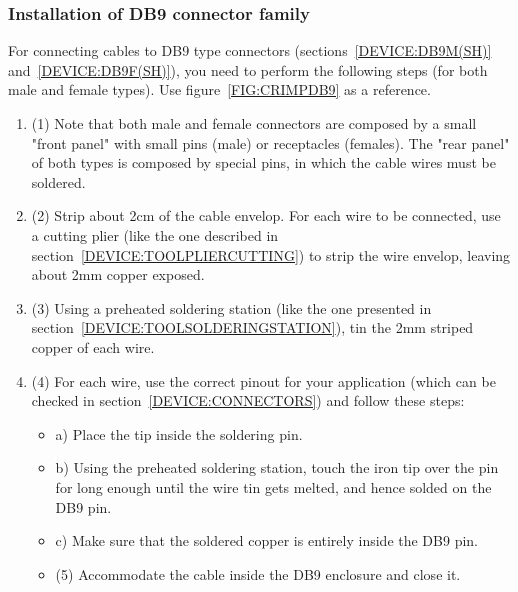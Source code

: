 \subsubsection{Installation of DB9 connector family} \label{CRIMPINGDB9}
For connecting cables to DB9 type connectors (sections~\ref{DEVICE:DB9M(SH)} and~\ref{DEVICE:DB9F(SH)}), you need to perform the following steps (for both male and female types). Use figure~\ref{FIG:CRIMPDB9} as a reference.
\begin{enumerate}
  \item (1) Note that both male and female connectors are composed by a small "front panel" with small pins (male) or receptacles (females). The "rear panel" of both types is composed by special pins, in which the cable wires must be soldered.
  \item (2) Strip about 2cm of the cable envelop. For each wire to be connected, use a cutting plier (like the one described in section~\ref{DEVICE:TOOLPLIERCUTTING}) to strip the wire envelop, leaving about 2mm copper exposed.
  \item (3) Using a preheated soldering station (like the one presented in section~\ref{DEVICE:TOOLSOLDERINGSTATION}), tin the 2mm striped copper of each wire.
  \item (4) For each wire, use the correct pinout for your application (which can be checked in section~\ref{DEVICE:CONNECTORS}) and follow these steps:
  \begin{itemize}
    \item a) Place the tip inside the soldering pin.
    \item b) Using the preheated soldering station, touch the iron tip over the pin for long enough until the wire tin gets melted, and hence solded on the DB9 pin.
    \item c) Make sure that the soldered copper is entirely inside the DB9 pin.
  \item (5) Accommodate the cable inside the DB9 enclosure and close it.
  \end{itemize}
\end{enumerate}
